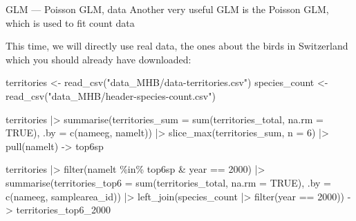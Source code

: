 \documentclass[
  10pt,
  ignorenonframetext,
  aspectratio=169,
  t]{beamer}
\newenvironment{Shaded}{\begin{snugshade}}{\end{snugshade}}
\newcommand{\AttributeTok}[1]{\textcolor[rgb]{0.40,0.45,0.13}{#1}}
\newcommand{\ConstantTok}[1]{\textcolor[rgb]{0.56,0.35,0.01}{#1}}
\newcommand{\DecValTok}[1]{\textcolor[rgb]{0.68,0.00,0.00}{#1}}
\newcommand{\FunctionTok}[1]{\textcolor[rgb]{0.28,0.35,0.67}{#1}}
\newcommand{\NormalTok}[1]{\textcolor[rgb]{0.00,0.23,0.31}{#1}}
\newcommand{\OtherTok}[1]{\textcolor[rgb]{0.00,0.23,0.31}{#1}}
\newcommand{\SpecialCharTok}[1]{\textcolor[rgb]{0.37,0.37,0.37}{#1}}
\newcommand{\StringTok}[1]{\textcolor[rgb]{0.13,0.47,0.30}{#1}}
\begin{document}
\begin{frame}[fragile]{GLM --- Poisson GLM, data}
\protect{}\label{glm-poisson-glm-data}
Another very useful GLM is the Poisson GLM, which is used to fit count
data

This time, we will directly use real data, the ones about the birds in
Switzerland which you should already have downloaded:

\footnotesize

\begin{Shaded}
\begin{Highlighting}[]
\NormalTok{territories }\OtherTok{\textless{}{-}} \FunctionTok{read\_csv}\NormalTok{(}\StringTok{"data\_MHB/data{-}territories.csv"}\NormalTok{)}
\NormalTok{species\_count }\OtherTok{\textless{}{-}} \FunctionTok{read\_csv}\NormalTok{(}\StringTok{"data\_MHB/header{-}species{-}count.csv"}\NormalTok{)}

\NormalTok{territories }\SpecialCharTok{|\textgreater{}} 
    \FunctionTok{summarise}\NormalTok{(}\AttributeTok{territories\_sum =} \FunctionTok{sum}\NormalTok{(territories\_total, }\AttributeTok{na.rm =} \ConstantTok{TRUE}\NormalTok{),}
              \AttributeTok{.by =} \FunctionTok{c}\NormalTok{(nameeg, namelt)) }\SpecialCharTok{|\textgreater{}} 
    \FunctionTok{slice\_max}\NormalTok{(territories\_sum, }\AttributeTok{n =} \DecValTok{6}\NormalTok{) }\SpecialCharTok{|\textgreater{}} 
    \FunctionTok{pull}\NormalTok{(namelt) }\OtherTok{{-}\textgreater{}}\NormalTok{ top6sp}

\NormalTok{territories }\SpecialCharTok{|\textgreater{}} 
    \FunctionTok{filter}\NormalTok{(namelt }\SpecialCharTok{\%in\%}\NormalTok{ top6sp }\SpecialCharTok{\&}\NormalTok{ year }\SpecialCharTok{==} \DecValTok{2000}\NormalTok{) }\SpecialCharTok{|\textgreater{}} 
    \FunctionTok{summarise}\NormalTok{(}\AttributeTok{territories\_top6 =} \FunctionTok{sum}\NormalTok{(territories\_total, }\AttributeTok{na.rm =} \ConstantTok{TRUE}\NormalTok{),}
              \AttributeTok{.by =} \FunctionTok{c}\NormalTok{(nameeg, samplearea\_id)) }\SpecialCharTok{|\textgreater{}} 
    \FunctionTok{left\_join}\NormalTok{(species\_count }\SpecialCharTok{|\textgreater{}} \FunctionTok{filter}\NormalTok{(year }\SpecialCharTok{==} \DecValTok{2000}\NormalTok{)) }\OtherTok{{-}\textgreater{}}\NormalTok{ territories\_top6\_2000}
\end{Highlighting}
\end{Shaded}

\normalsize
\end{frame}
\end{document}
